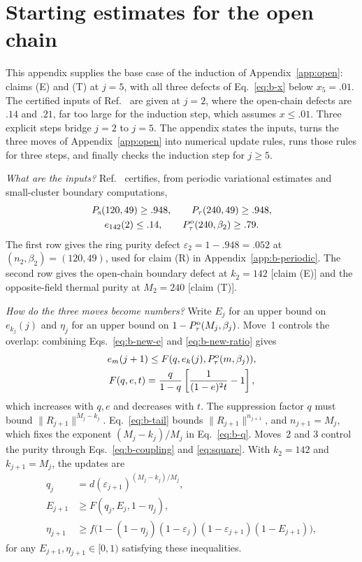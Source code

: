 \documentclass[aps,prl,reprint,amsmath,amssymb,nofootinbib,raggedbottom]{revtex4-2}
\begin{document}
\section{Starting estimates for the open chain}\label{app:b-iteration}
This appendix supplies the base case of the induction of
Appendix~\ref{app:open}: claims (E) and (T) at $j=5$, with all three defects of
Eq.~\eqref{eq:b-x} below $x_5=.01$. The certified inputs of
Ref.~\cite{boundary} are given at $j=2$, where the open-chain defects are $.14$
and $.21$, far too large for the induction step, which assumes $x\le.01$. Three
explicit steps bridge $j=2$ to $j=5$. The appendix states the inputs, turns the
three moves of Appendix~\ref{app:open} into numerical update rules, runs those
rules for three steps, and finally checks the induction step for $j\ge5$.

\emph{What are the inputs?} Ref.~\cite{boundary} certifies, from periodic
variational estimates and small-cluster boundary computations,
\begin{equation}
 \begin{gathered}
 P_{\mathrm s}(120,49)\ge .948,\qquad P_{\tau}(240,49)\ge .948,\\
 e_{142}(2)\le .14,\qquad P_{\tau}^{\mathrm{o}}(240,\beta_{2})\ge .79.
 \end{gathered}
 \label{eq:b-seeds}
\end{equation}
The first row gives the ring purity defect $\varepsilon_2=1-.948=.052$ at
$(n_2,\beta_2)=(120,49)$, used for claim (R) in
Appendix~\ref{app:b-periodic}. The second row gives the open-chain boundary
defect at $k_2=142$ [claim (E)] and the opposite-field thermal purity at
$M_2=240$ [claim (T)].

\emph{How do the three moves become numbers?} Write $E_j$ for an upper bound on
$e_{k_j}(j)$ and $\eta_j$ for an upper bound on $1-P_{\tau}^{\mathrm{o}}(M_j,\beta_j)$.
Move~1 controls the overlap: combining Eqs.~\eqref{eq:b-new-e} and
\eqref{eq:b-new-ratio} gives
\begin{equation}
 \begin{gathered}
 e_m(j+1)\le F(q,e_k(j),P_{\tau}^{\mathrm{o}}(m,\beta_j)),\\
 F(q,e,t)=\frac{q}{1-q}\left[\frac1{(1-e)^2t}-1\right],
 \end{gathered}
 \label{eq:b-F}
\end{equation}
which increases with $q,e$ and decreases with $t$. The suppression factor $q$
must bound $\|R_{j+1}\|^{M_j-k_j}$. Eq.~\eqref{eq:b-tail} bounds
$\|R_{j+1}\|^{n_{j+1}}$, and $n_{j+1}=M_j$, which fixes the exponent
$(M_j-k_j)/M_j$ in Eq.~\eqref{eq:b-q}. Moves~2 and 3 control the purity through
Eqs.~\eqref{eq:b-coupling} and \eqref{eq:square}. With $k_2=142$ and
$k_{j+1}=M_j$, the updates are
\begin{align}
 q_j&=d(\varepsilon_{j+1})^{(M_j-k_j)/M_j},\label{eq:b-q}\\
 E_{j+1}&\ge F(q_j,E_j,1-\eta_j),\label{eq:b-E-update}\\
 \eta_{j+1}&\ge f\bigl(1-(1-\eta_j)(1-\varepsilon_j)
                   (1-\varepsilon_{j+1})(1-E_{j+1})\bigr),
 \label{eq:b-eta-update}
\end{align}
for any $E_{j+1},\eta_{j+1}\in[0,1)$ satisfying these inequalities.
\end{document}
